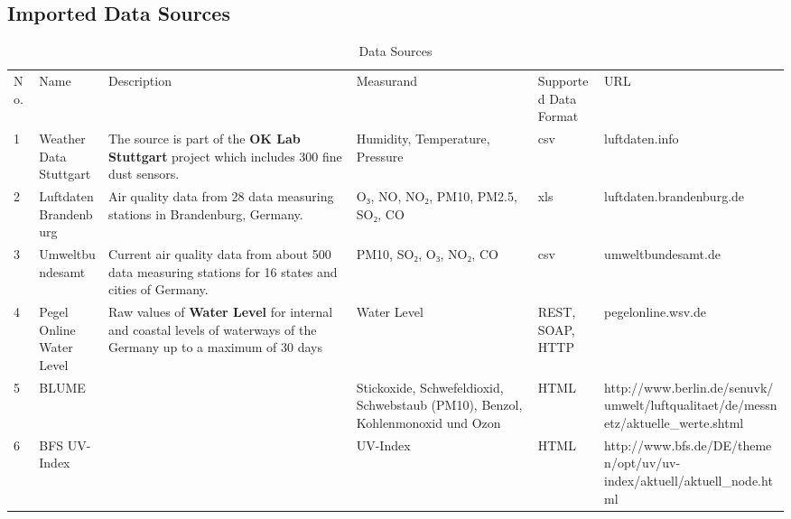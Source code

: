 \documentclass{llncs}
\begin{document}
\begin{thebibliography}{}  %

%
%

\appendix

\section{Imported Data Sources}

\begin{table}[]
\centering
\caption{Data Sources}
\label{data_sources}
\begin{tabular}{llllll}
 No. & Name  & Description & Measurand & Supported Data Format & URL \\
 1 & Weather Data Stuttgart & The source is part of the \textbf{OK Lab Stuttgart} project which includes 300 fine dust sensors. & Humidity, Temperature, Pressure &csv & luftdaten.info \\
 2 & Luftdaten Brandenburg & Air quality data from 28 data measuring stations in Brandenburg, Germany. & O₃, NO, NO₂, PM10, PM2.5, SO₂, CO & xls & luftdaten.brandenburg.de \\
 3 & Umweltbundesamt & Current air quality data from about 500 data measuring stations for 16 states and cities of Germany. & PM10, SO₂, O₃, NO₂, CO & csv &  umweltbundesamt.de \\
 4 & Pegel Online Water Level & Raw values of \textbf{Water Level} for internal and coastal levels of waterways of the Germany up to a maximum of 30 days & Water Level & REST, SOAP, HTTP & pegelonline.wsv.de \\
 5 & BLUME &  & Stickoxide, Schwefeldioxid, Schwebstaub (PM10), Benzol, Kohlenmonoxid und Ozon & HTML & http://www.berlin.de/senuvk/umwelt/luftqualitaet/de/messnetz/aktuelle_werte.shtml \\
 6 & BFS UV-Index &  & UV-Index & HTML & http://www.bfs.de/DE/themen/opt/uv/uv-index/aktuell/aktuell_node.html
\end{tabular}
\end{table}


\end{thebibliography}
\end{document}
